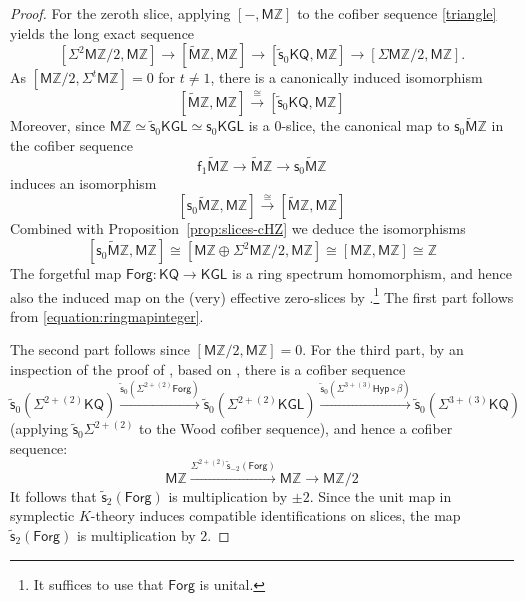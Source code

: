 \documentclass[11pt,hyp,english]{article}
\newcommand{\Z}{\mathbb{Z}}
\newcommand{\KGL}{\mathsf{KGL}}
\newcommand{\KQ}{\mathsf{KQ}}
\newcommand{\HZ}{\mathsf{M}\Z}
\newcommand{\cHZ}{\wt{{\mathsf{M}}}{\Z}}
\newcommand{\wt}[1]{\widetilde{#1}}
\newcommand{\s}{\mathsf{s}}
\newcommand{\vs}{\tilde{\mathsf{s}}}
\newcommand{\f}{\mathsf{f}}
\newcommand{\Forg}{\mathsf{Forg}}
\newcommand{\Hyper}{\mathsf{Hyp}}
\theoremstyle{definition}
\begin{document}
\begin{proof}
For the zeroth slice, 
applying $[-,\HZ]$ to the cofiber sequence \eqref{triangle} yields the long exact sequence
\[
[\Sigma^{2}\HZ/2,\HZ]\to[\cHZ,\HZ]\to[\vs_0\KQ ,\HZ]\to[\Sigma\HZ/2,\HZ].
\]
As $[\HZ/2,\Sigma^{t}\HZ]=0$ for $t\ne 1$, 
there is a canonically induced isomorphism
$$[\cHZ,\HZ]\xrightarrow{\cong} [\vs_0\KQ ,\HZ]$$ 
Moreover, since $\HZ\simeq\vs_0\KGL\simeq\s_0\KGL$ is a $0$-slice, the canonical map to 
$\s_0\cHZ$ in the cofiber sequence
\[ \f_1\cHZ\to \cHZ \to \s_0\cHZ \]
induces an isomorphism 
$$[\s_0\cHZ,\HZ]\xrightarrow{\cong} [\cHZ,\HZ]$$
Combined with Proposition~\ref{prop:slices-cHZ} we deduce the isomorphisms
\begin{equation}
\label{equation:ringmapinteger}
[\s_0\cHZ,\HZ]\cong [\HZ\oplus \Sigma^{2}\HZ/2,\HZ]\cong [\HZ,\HZ] \cong \Z
\end{equation}
The forgetful map $\Forg:\KQ \to \KGL$ is a ring spectrum homomorphism, 
and hence also the induced
map on the (very) effective zero-slices by \cite{grso}.\footnote{It suffices to use that $\Forg$ is unital.} 
The first part follows from \eqref{equation:ringmapinteger}.

The second part follows since $[\HZ/2,\HZ]=0$. 
For the third part, 
by an inspection of the proof of \cite[Theorem 16]{Bachmann}, 
based on \cite[Theorem 4.4]{RO:slices},  
there is a cofiber sequence
\[
\vs_0(\Sigma^{2+(2)}\KQ) \xrightarrow{\vs_0(\Sigma^{2+(2)}\Forg)} \vs_0(\Sigma^{2+(2)}\KGL) 
\xrightarrow{\vs_0(\Sigma^{3+(3)}\Hyper \circ \beta)} \vs_0(\Sigma^{3+(3)}\KQ) 
\]
(applying $\vs_0\Sigma^{2+(2)}$ to the Wood cofiber sequence), and hence a cofiber sequence:
\[
\HZ\xrightarrow{\Sigma^{2+(2)}\vs_{-2}(\Forg)} \HZ \to \HZ/2 
\]
It follows that $\vs_2(\Forg)$ is multiplication by $\pm 2$. 
Since the unit map in symplectic $K$-theory induces compatible identifications on slices, 
the map $\vs_2(\Forg)$ is multiplication by $2$.
\end{proof}
\end{document}
